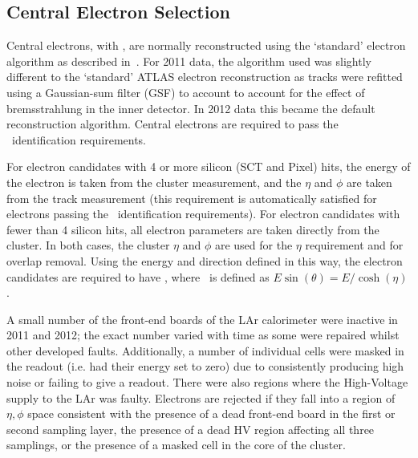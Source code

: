 \subsection{Central Electron Selection}

Central electrons, with , are normally reconstructed using the
`standard' electron algorithm as described in~.  For 2011
data, the algorithm used was slightly different to the `standard' ATLAS electron
reconstruction as tracks were refitted using a Gaussian-sum filter (GSF) to
account to account for the effect of bremsstrahlung in the inner detector. In
2012 data this became the default reconstruction algorithm. Central electrons
are required to pass the \loosePP\ identification requirements.

For electron candidates with 4 or more silicon (SCT and Pixel) hits, the energy
of the electron is taken from the cluster measurement, and the $\eta$ and $\phi$
are taken from the track measurement (this requirement is automatically
satisfied for electrons passing the \loosePP\ identification requirements). For
electron candidates with fewer than 4 silicon hits, all electron parameters are
taken directly from the cluster. In both cases, the cluster $\eta$ and $\phi$
are used for the $\eta$ requirement and for overlap removal. Using the energy
and direction defined in this way, the electron candidates are required to have
, where \et\ is defined as $E\sin(\theta)=E/\cosh(\eta)$. 

A small number of the front-end boards of the LAr calorimeter were
inactive in 2011 and 2012; the exact number varied with time as some were
repaired whilst other developed faults. Additionally, a number of individual
cells were masked in the readout (i.e. had their energy set to zero) due to
consistently producing high noise or failing to give a readout. There were also
regions where the High-Voltage supply to the LAr was faulty. Electrons are
rejected if they fall into a region of $\eta, \phi$ space consistent with the
presence of a dead front-end board in the first or second sampling layer, the
presence of a dead HV region affecting all three samplings, or the presence of a
masked cell in the core of the cluster.

